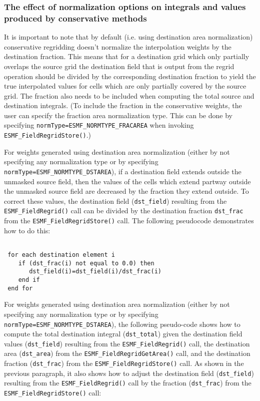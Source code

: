 \subsubsection{The effect of normalization options on integrals and values produced by conservative methods}\label{sec:interpolation:conservative_norm_opts}
 It is important to note that by default (i.e. using destination area normalization) 
conservative regridding doesn't normalize the interpolation weights by the destination fraction. 
This means that for a destination grid which only partially overlaps the source grid
the destination field that is output from the regrid operation 
should be divided by the corresponding destination fraction to yield the 
true interpolated values for cells which are only partially covered by the source grid. 
The fraction also needs to be included when computing the total source and destination integrals. 
(To include the fraction in the conservative weights, the user can specify 
the fraction area normalization type. This can be done by specifying {\tt normType=ESMF\_NORMTYPE\_FRACAREA} when
invoking {\tt ESMF\_FieldRegridStore()}.)

For weights generated using destination area normalization (either by not specifying any normalization type or by specifying {\tt normType=ESMF\_NORMTYPE\_DSTAREA}), if a destination field extends 
outside the unmasked source field, then the values of the cells which 
extend partway outside the unmasked source field are decreased by the fraction they extend outside. 
To correct these values, the destination field ({\tt dst\_field}) resulting
from the {\tt ESMF\_FieldRegrid()} call can be divided by the destination fraction {\tt dst\_frac} 
from the {\tt ESMF\_FieldRegridStore()} call. The following pseudocode demonstrates  how to do this:

\begin{verbatim}

 for each destination element i
    if (dst_frac(i) not equal to 0.0) then
       dst_field(i)=dst_field(i)/dst_frac(i)
    end if
 end for
\end{verbatim}

For weights generated using destination area normalization (either by not specifying any normalization type or by specifying {\tt normType=ESMF\_NORMTYPE\_DSTAREA}), 
the following pseudo-code shows how to compute the total destination integral ({\tt dst\_total}) given the
destination field values ({\tt dst\_field}) resulting
from the {\tt ESMF\_FieldRegrid()} call, the destination area ({\tt dst\_area}) from the {\tt ESMF\_FieldRegridGetArea()} call,  and the destination fraction ({\tt dst\_frac}) from the {\tt ESMF\_FieldRegridStore()} call. As shown in the previous paragraph, it also 
shows how to adjust the destination field ({\tt dst\_field}) resulting from the {\tt ESMF\_FieldRegrid()} call by the
fraction ({\tt dst\_frac}) from the {\tt ESMF\_FieldRegridStore()} call: 

